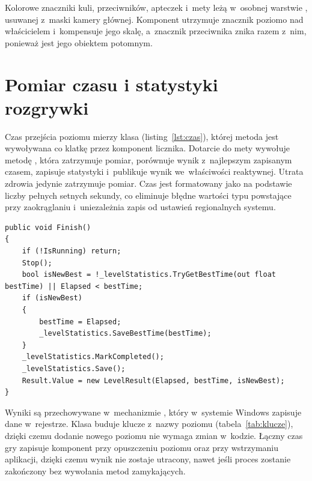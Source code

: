 Kolorowe znaczniki kuli, przeciwników, apteczek i~mety leżą w~osobnej warstwie
, usuwanej z~maski kamery głównej. Komponent  utrzymuje
znacznik poziomo nad właścicielem i~kompensuje jego skalę, a~znacznik przeciwnika znika
razem z~nim, ponieważ jest jego obiektem potomnym.

\section{Pomiar czasu i statystyki rozgrywki}

Czas przejścia poziomu mierzy klasa  (listing~\ref{lst:czas}),
której metoda  jest wywoływana co klatkę przez komponent licznika. Dotarcie do
mety wywołuje metodę , która zatrzymuje pomiar, porównuje wynik
z~najlepszym zapisanym czasem, zapisuje statystyki i~publikuje wynik we~właściwości
reaktywnej. Utrata zdrowia jedynie zatrzymuje pomiar. Czas jest formatowany jako
 na podstawie liczby pełnych setnych sekundy, co eliminuje błędne wartości
typu  powstające przy zaokrąglaniu i~uniezależnia zapis od ustawień
regionalnych systemu.

\begin{lstlisting}[caption={Zakończenie pomiaru czasu w~klasie LevelTimerLogic; \zrodloWlasne},label=lst:czas]
public void Finish()
{
    if (!IsRunning) return;
    Stop();
    bool isNewBest = !_levelStatistics.TryGetBestTime(out float bestTime) || Elapsed < bestTime;
    if (isNewBest)
    {
        bestTime = Elapsed;
        _levelStatistics.SaveBestTime(bestTime);
    }
    _levelStatistics.MarkCompleted();
    _levelStatistics.Save();
    Result.Value = new LevelResult(Elapsed, bestTime, isNewBest);
}
\end{lstlisting}

Wyniki są przechowywane w~mechanizmie  \cite{unity-playerprefs}, który
w~systemie Windows zapisuje dane w~rejestrze. Klasa  buduje klucze z~nazwy poziomu
(tabela~\ref{tab:klucze}), dzięki czemu dodanie nowego poziomu nie wymaga zmian w~kodzie.
Łączny czas gry zapisuje komponent  przy opuszczeniu
poziomu oraz przy wstrzymaniu aplikacji, dzięki czemu wynik nie zostaje utracony, nawet
jeśli proces zostanie zakończony bez wywołania metod zamykających.

